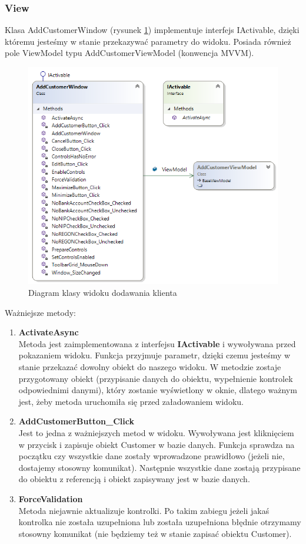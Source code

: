 \subsubsection{View}
Klasa AddCustomerWindow (rysunek \ref{fig:addCustomerWindowDiagram}) implementuje interfejs IActivable, dzięki któremu jesteśmy w stanie przekazywać parametry do widoku. Posiada również pole ViewModel typu AddCustomerViewModel (konwencja MVVM).

\begin{figure}[ht!]
\centering
  \includegraphics[width=0.7\linewidth]{Rysunki/AddCustomerWindowDiagram.png}
  \caption{Diagram klasy widoku dodawania klienta}
  \label{fig:addCustomerWindowDiagram}
\end{figure}

Ważniejsze metody:

\begin{enumerate}
    \item \textbf{ActivateAsync} \\
    Metoda jest zaimplementowana z interfejsu \textbf{IActivable} i wywoływana przed pokazaniem widoku. Funkcja przyjmuje parametr, dzięki czemu jesteśmy w stanie przekazać dowolny obiekt do naszego widoku. W metodzie zostaje przygotowany obiekt (przypisanie danych do obiektu, wypełnienie kontrolek odpowiednimi danymi), który zostanie wyświetlony w oknie, dlatego ważnym jest, żeby metoda uruchomiła się przed załadowaniem widoku. 
    \\
    \item \textbf{AddCustomerButton\_Click} \\
    Jest to jedna z ważniejszych metod w widoku. Wywoływana jest kliknięciem w przycisk i zapisuje obiekt Customer w bazie danych. Funkcja sprawdza na początku czy wszystkie dane zostały wprowadzone prawidłowo (jeżeli nie, dostajemy stosowny komunikat). Następnie wszystkie dane zostają przypisane do obiektu z referencją i obiekt zapisywany jest w bazie danych.
    \\
    \item \textbf{ForceValidation} \\
    Metoda niejawnie aktualizuje kontrolki. Po takim zabiegu jeżeli jakaś kontrolka nie została uzupełniona lub została uzupełniona błędnie otrzymamy stosowny komunikat (nie będziemy też w stanie zapisać obiektu Customer).
\end{enumerate}


